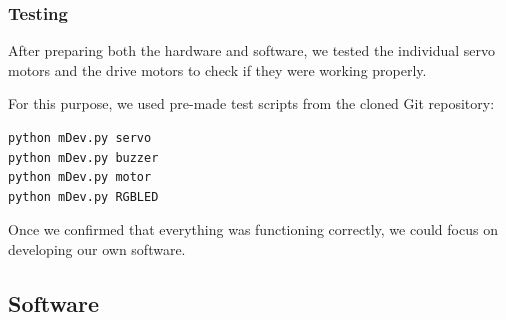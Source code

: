 \subsubsection{Testing}
After preparing both the hardware and software, we tested the individual servo motors and the drive motors to check if they were working properly.

For this purpose, we used pre-made test scripts from the cloned Git repository:
\begin{verbatim}
python mDev.py servo
python mDev.py buzzer
python mDev.py motor
python mDev.py RGBLED
\end{verbatim}

Once we confirmed that everything was functioning correctly, we could focus on developing our own software.

\subsection{Software}









